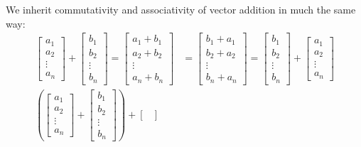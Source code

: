 \documentclass{article}
\begin{document}
We inherit commutativity and associativity of vector addition in much the same way:
\begin{align*}
    \begin{bmatrix}
        a_1 \\
        a_2\\
        \vdots\\
        a_n
    \end{bmatrix}+\begin{bmatrix}
        b_1 \\
        b_2\\
        \vdots\\
        b_n
    \end{bmatrix}=\begin{bmatrix}
        a_1+b_1 \\
        a_2+b_2\\
        \vdots\\
        a_n+b_n
    \end{bmatrix}&=\begin{bmatrix}
        b_1+a_1 \\
        b_2+a_2\\
        \vdots\\
        b_n+a_n
    \end{bmatrix}=\begin{bmatrix}
        b_1 \\
        b_2\\
        \vdots\\
        b_n
    \end{bmatrix}+\begin{bmatrix}
        a_1 \\
        a_2\\
        \vdots\\
        a_n
    \end{bmatrix}\tag{VS2}
    \\
    \left(\begin{bmatrix}
        a_1 \\
        a_2\\
        \vdots\\
        a_n
    \end{bmatrix}+\begin{bmatrix}
        b_1 \\
        b_2\\
        \vdots\\
        b_n
    \end{bmatrix}\right)+\begin{bmatrix}

\end{bmatrix}
\end{align*}
\end{document}
